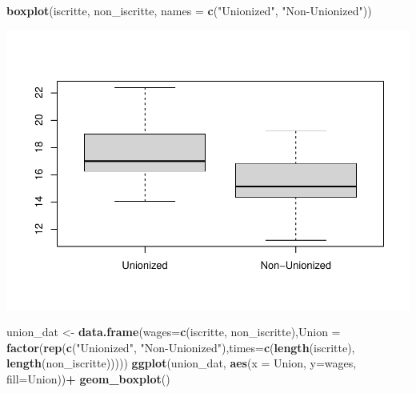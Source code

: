 \documentclass[
]{article}
\newenvironment{Shaded}{\begin{snugshade}}{\end{snugshade}}
\newcommand{\AttributeTok}[1]{\textcolor[rgb]{0.13,0.29,0.53}{#1}}
\newcommand{\FunctionTok}[1]{\textcolor[rgb]{0.13,0.29,0.53}{\textbf{#1}}}
\newcommand{\NormalTok}[1]{#1}
\newcommand{\OtherTok}[1]{\textcolor[rgb]{0.56,0.35,0.01}{#1}}
\newcommand{\SpecialCharTok}[1]{\textcolor[rgb]{0.81,0.36,0.00}{\textbf{#1}}}
\newcommand{\StringTok}[1]{\textcolor[rgb]{0.31,0.60,0.02}{#1}}
\begin{document}
\begin{Shaded}
\begin{Highlighting}[]
\FunctionTok{boxplot}\NormalTok{(iscritte, non\_iscritte, }\AttributeTok{names =} \FunctionTok{c}\NormalTok{(}\StringTok{"Unionized"}\NormalTok{, }\StringTok{"Non{-}Unionized"}\NormalTok{))}
\end{Highlighting}
\end{Shaded}

\includegraphics{Hypothesis_Testing_files/figure-latex/unnamed-chunk-29-1.pdf}

\begin{Shaded}
\begin{Highlighting}[]
\NormalTok{union\_dat }\OtherTok{\textless{}{-}} \FunctionTok{data.frame}\NormalTok{(}\AttributeTok{wages=}\FunctionTok{c}\NormalTok{(iscritte, non\_iscritte),}\AttributeTok{Union =} \FunctionTok{factor}\NormalTok{(}\FunctionTok{rep}\NormalTok{(}\FunctionTok{c}\NormalTok{(}\StringTok{"Unionized"}\NormalTok{, }\StringTok{"Non{-}Unionized"}\NormalTok{),}\AttributeTok{times=}\FunctionTok{c}\NormalTok{(}\FunctionTok{length}\NormalTok{(iscritte), }\FunctionTok{length}\NormalTok{(non\_iscritte)))))}
\FunctionTok{ggplot}\NormalTok{(union\_dat, }\FunctionTok{aes}\NormalTok{(}\AttributeTok{x =}\NormalTok{ Union, }\AttributeTok{y=}\NormalTok{wages, }\AttributeTok{fill=}\NormalTok{Union))}\SpecialCharTok{+}
  \FunctionTok{geom\_boxplot}\NormalTok{()}
\end{Highlighting}
\end{Shaded}
\end{document}
